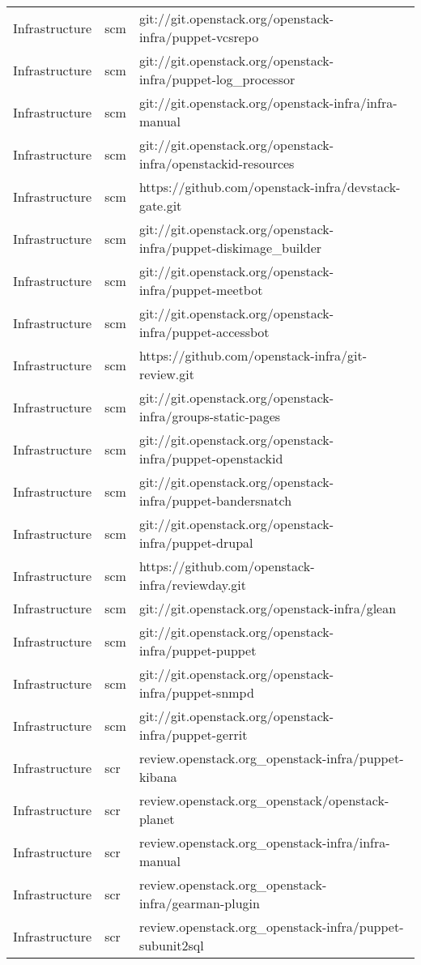 \begin{center}
\begin{longtable}{|p{4cm}|p{1cm}|p{10cm}|}
Infrastructure&scm&git://git.openstack.org/openstack-infra/puppet-vcsrepo\\ 
Infrastructure&scm&git://git.openstack.org/openstack-infra/puppet-log\_processor\\ 
Infrastructure&scm&git://git.openstack.org/openstack-infra/infra-manual\\ 
Infrastructure&scm&git://git.openstack.org/openstack-infra/openstackid-resources\\ 
Infrastructure&scm&https://github.com/openstack-infra/devstack-gate.git\\ 
Infrastructure&scm&git://git.openstack.org/openstack-infra/puppet-diskimage\_builder\\ 
Infrastructure&scm&git://git.openstack.org/openstack-infra/puppet-meetbot\\ 
Infrastructure&scm&git://git.openstack.org/openstack-infra/puppet-accessbot\\ 
Infrastructure&scm&https://github.com/openstack-infra/git-review.git\\ 
Infrastructure&scm&git://git.openstack.org/openstack-infra/groups-static-pages\\ 
Infrastructure&scm&git://git.openstack.org/openstack-infra/puppet-openstackid\\ 
Infrastructure&scm&git://git.openstack.org/openstack-infra/puppet-bandersnatch\\ 
Infrastructure&scm&git://git.openstack.org/openstack-infra/puppet-drupal\\ 
Infrastructure&scm&https://github.com/openstack-infra/reviewday.git\\ 
Infrastructure&scm&git://git.openstack.org/openstack-infra/glean\\ 
Infrastructure&scm&git://git.openstack.org/openstack-infra/puppet-puppet\\ 
Infrastructure&scm&git://git.openstack.org/openstack-infra/puppet-snmpd\\ 
Infrastructure&scm&git://git.openstack.org/openstack-infra/puppet-gerrit\\ 
Infrastructure&scr&review.openstack.org\_openstack-infra/puppet-kibana\\ 
Infrastructure&scr&review.openstack.org\_openstack/openstack-planet\\ 
Infrastructure&scr&review.openstack.org\_openstack-infra/infra-manual\\ 
Infrastructure&scr&review.openstack.org\_openstack-infra/gearman-plugin\\ 
Infrastructure&scr&review.openstack.org\_openstack-infra/puppet-subunit2sql\\ 

\end{longtable}
\end{center}
